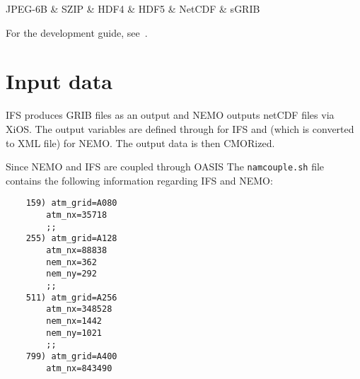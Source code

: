 \begin{dependency}
\begin{deptext}
JPEG-6B \& SZIP \& HDF4 \& HDF5 \& NetCDF \& sGRIB \\
\end{deptext}
\end{dependency}

For the development guide, see~\cite{dev-guide}.


\section{Input data}
\gls{IFS} produces \gls{GRIB} files as an output and \gls{NEMO} outputs \gls{netCDF} files via XiOS. 
The output variables are defined through  for IFS and  (which is converted to XML file) for \gls{NEMO}.
The output data is then \gls{CMOR}ized.

Since \gls{NEMO} and \gls{IFS} are coupled through OASIS \cite{TM673}
The \texttt{namcouple.sh} file contains the following information regarding \gls{IFS} and \gls{NEMO}:

\begin{lstlisting}
    159) atm_grid=A080
        atm_nx=35718
        ;;
    255) atm_grid=A128
        atm_nx=88838
        nem_nx=362
        nem_ny=292
        ;;
    511) atm_grid=A256
        atm_nx=348528
        nem_nx=1442
        nem_ny=1021
        ;;
    799) atm_grid=A400
        atm_nx=843490  
\end{lstlisting}









